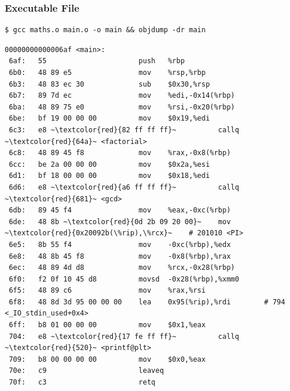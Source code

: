 \documentclass{beamer}
\begin{document}
\begin{frame}[fragile]
\frametitle{Executable File}
\tiny
\begin{verbatim}
$ gcc maths.o main.o -o main && objdump -dr main
\end{verbatim}
\vspace{-0.2cm}
\begin{lstlisting}[numbers=none, escapechar={~}]
00000000000006af <main>:
 6af:   55                      push   %rbp
 6b0:   48 89 e5                mov    %rsp,%rbp
 6b3:   48 83 ec 30             sub    $0x30,%rsp
 6b7:   89 7d ec                mov    %edi,-0x14(%rbp)
 6ba:   48 89 75 e0             mov    %rsi,-0x20(%rbp)
 6be:   bf 19 00 00 00          mov    $0x19,%edi
 6c3:   e8 ~\textcolor{red}{82 ff ff ff}~          callq  ~\textcolor{red}{64a}~ <factorial>
 6c8:   48 89 45 f8             mov    %rax,-0x8(%rbp)
 6cc:   be 2a 00 00 00          mov    $0x2a,%esi
 6d1:   bf 18 00 00 00          mov    $0x18,%edi
 6d6:   e8 ~\textcolor{red}{a6 ff ff ff}~          callq  ~\textcolor{red}{681}~ <gcd>
 6db:   89 45 f4                mov    %eax,-0xc(%rbp)
 6de:   48 8b ~\textcolor{red}{0d 2b 09 20 00}~    mov    ~\textcolor{red}{0x20092b(\%rip),\%rcx}~    # 201010 <PI>
 6e5:   8b 55 f4                mov    -0xc(%rbp),%edx
 6e8:   48 8b 45 f8             mov    -0x8(%rbp),%rax
 6ec:   48 89 4d d8             mov    %rcx,-0x28(%rbp)
 6f0:   f2 0f 10 45 d8          movsd  -0x28(%rbp),%xmm0
 6f5:   48 89 c6                mov    %rax,%rsi
 6f8:   48 8d 3d 95 00 00 00    lea    0x95(%rip),%rdi        # 794 <_IO_stdin_used+0x4>
 6ff:   b8 01 00 00 00          mov    $0x1,%eax
 704:   e8 ~\textcolor{red}{17 fe ff ff}~          callq  ~\textcolor{red}{520}~ <printf@plt>
 709:   b8 00 00 00 00          mov    $0x0,%eax
 70e:   c9                      leaveq
 70f:   c3                      retq
\end{lstlisting}

\end{frame}
\end{document}
